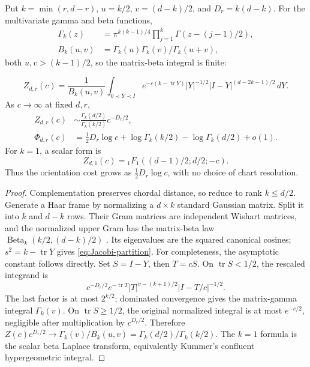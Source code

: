 \begin{proposition}
\label{prop:Haar-Jacobi}
Put $k=\min(r,d-r)$, $u=k/2$, $v=(d-k)/2$, and $D_r=k(d-k)$.
For the multivariate gamma and beta functions,
\begin{align}
 \Gamma_k(z)&=\pi^{k(k-1)/4}\prod_{j=1}^k\Gamma(z-(j-1)/2),\\
 B_k(u,v)&=\Gamma_k(u)\Gamma_k(v)/\Gamma_k(u+v),
\end{align}
both $u,v>(k-1)/2$, so the matrix-beta integral is finite:

\begin{equation}
 Z_{d,r}(c)=\frac1{B_k(u,v)}\int_{0\prec Y\prec I}
 e^{-c(k-\operatorname{tr}Y)}|Y|^{-1/2}
                  |I-Y|^{(d-2k-1)/2}\,dY.
 \label{eq:Jacobi-partition}
\end{equation}
As $c\to\infty$ at fixed $d,r$,
\begin{align}
 Z_{d,r}(c)&\sim\frac{\Gamma_k(d/2)}{\Gamma_k(k/2)}c^{-D_r/2},\\
 \Phi_{d,r}(c)&=\tfrac12D_r\log c+
                   \log\Gamma_k(k/2)-\log\Gamma_k(d/2)+o(1).
 \label{eq:intrinsic-orbital-entropy}
\end{align}
For $k=1$, a scalar form is
\begin{equation}
 Z_{d,1}(c)={}_1F_1((d-1)/2;d/2;-c).
\end{equation}
Thus the orientation cost grows as $\tfrac12D_r\log c$, with no choice
of chart resolution.
\end{proposition}
\begin{proof}
Complementation preserves chordal distance, so reduce to rank $k\le d/2$.
Generate a Haar frame by normalizing a $d\times k$ standard Gaussian matrix.
Split it into $k$ and $d-k$ rows. Their Gram matrices are independent
Wishart matrices, and the normalized upper Gram has the matrix-beta law
$\operatorname{Beta}_k(k/2,(d-k)/2)$
\citep[Chapter 3]{muirhead1982aspects}. Its eigenvalues are the squared
canonical cosines; $s^2=k-\operatorname{tr}Y$ gives
\eqref{eq:Jacobi-partition}.
For completeness, the asymptotic constant follows directly. Set $S=I-Y$,
then $T=cS$. On $\operatorname{tr}S<1/2$, the rescaled integrand is
\begin{equation}
 c^{-D_r/2}e^{-\operatorname{tr}T}|T|^{v-(k+1)/2}
                         |I-T/c|^{-1/2}.
\end{equation}
The last factor is at most $2^{k/2}$; dominated convergence gives the
matrix-gamma integral $\Gamma_k(v)$. On $\operatorname{tr}S\ge1/2$,
the original normalized integral is at most $e^{-c/2}$, negligible after
multiplication by $c^{D_r/2}$. Therefore
$Z(c)c^{D_r/2}\to\Gamma_k(v)/B_k(u,v)=
\Gamma_k(d/2)/\Gamma_k(k/2)$. The $k=1$ formula is the scalar beta
Laplace transform, equivalently Kummer's confluent hypergeometric integral.
\end{proof}

